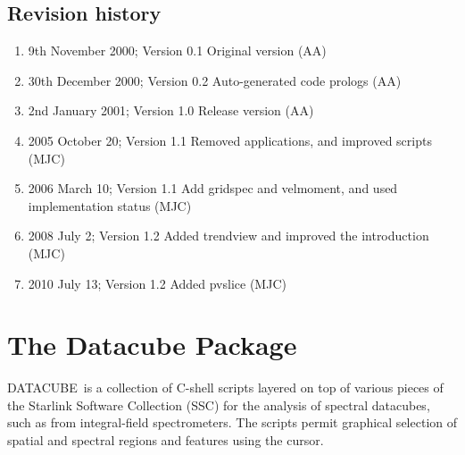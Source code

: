 \documentclass[twoside,11pt,nolof]{starlink}
\begin{document}
\scfrontmatter

 \subsection*{Revision history}

 \begin{enumerate}
   \item 9th November 2000; Version 0.1 Original version (AA)
   \item 30th December 2000; Version 0.2 Auto-generated code prologs (AA)
   \item 2nd January 2001; Version 1.0 Release version (AA)
   \item 2005 October 20; Version 1.1 Removed applications, and improved scripts (MJC)
   \item 2006 March 10; Version 1.1 Add gridspec and velmoment, and
         used implementation status (MJC)
   \item 2008 July 2; Version 1.2 Added trendview and improved the introduction (MJC)
   \item 2010 July 13; Version 1.2 Added pvslice (MJC)

 \end{enumerate}


\cleardoublepage
\newpage



\section{The Datacube Package\label{sun237_intro}}

DATACUBE\ is a collection of C-shell scripts layered on top of various
pieces of the Starlink Software Collection (SSC) for the analysis of
spectral datacubes, such as from integral-field spectrometers.  The
scripts permit graphical selection of spatial and spectral regions and
features using the cursor.
\end{document}
